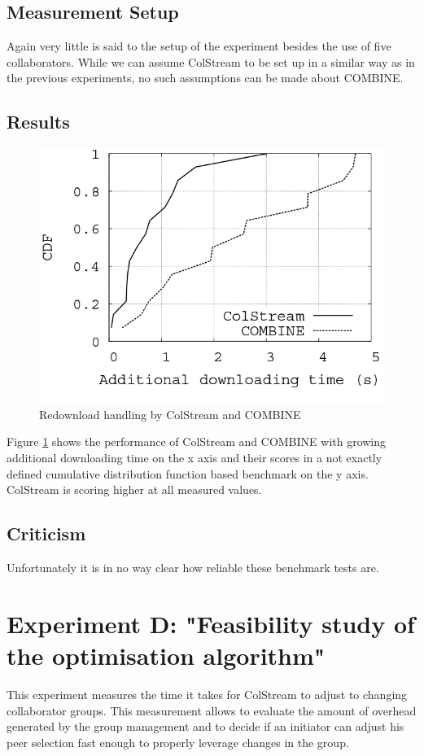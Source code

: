 \subsection{Measurement Setup}
Again very little is said to the setup of the experiment besides the use of five collaborators. While we can assume ColStream to be set up in a similar way as in the previous experiments, no such assumptions can be made about COMBINE.
\subsection{Results}
\begin{figure}[hbt]
\centering
\caption{Redownload handling by ColStream and COMBINE \cite{ColStream}}
\label{ColStreamCOMBINEComparisom}
\includegraphics[scale=.5]{figures/ColStreamCOMBINE.png}
\end{figure}

Figure \ref{ColStreamCOMBINEComparisom} shows the performance of ColStream and COMBINE with growing additional downloading time on the x axis and their scores in a not exactly defined cumulative distribution function based benchmark on the y axis. ColStream is scoring higher at all measured values.
\subsection{Criticism}
Unfortunately it is in no way clear how reliable these benchmark tests are.

\section{Experiment D: "Feasibility study of the optimisation algorithm"}
This experiment measures the time it takes for ColStream to adjust to changing collaborator groups. This measurement allows to evaluate the amount of overhead generated by the group management and to decide if an initiator can adjust his peer selection fast enough to properly leverage changes in the group.
